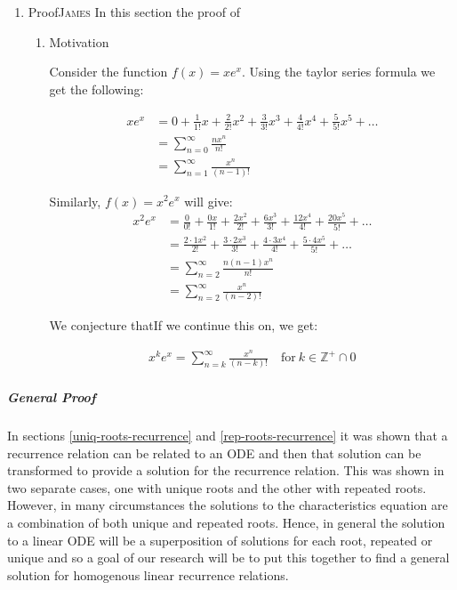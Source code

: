 \documentclass[a4paper,11pt,twoside]{article}
\begin{document}
\begin{enumerate}
\item Proof\hfill{}\textsc{James}
\label{prove-general-exp-identity}
In this section the proof of
\begin{enumerate}
\item Motivation
\label{sec:orgbc00bf8}

Consider the function \(f(x) = xe^x\). Using the taylor series formula we get the following:

\begin{align*}
    xe^x &= 0+\frac{1}{1!}x+\frac{2}{2!}x^2+\frac{3}{3!}x^3+\frac{4}{4!}x^4+\frac{5}{5!}x^5+\dots\\
    &= \sum_{n=0}^\infty \frac{nx^n}{n!}\\
    &= \sum_{n=1}^\infty \frac{x^n}{(n-1)!}
\end{align*}

Similarly, \(f(x) = x^2e^x\) will give:
\begin{align*}
    x^2e^x &= \frac{0}{0!} + \frac{0x}{1!} + \frac{2x^2}{2!} + \frac{6x^3}{3!} + \frac{12x^4}{4!} + \frac{20x^5}{5!} + \dots\\
    &= \frac{2\cdot 1x^2}{2!} + \frac{3\cdot 2 x^3}{3!} + \frac{4\cdot 3x^4}{4!} + \frac{5\cdot 4 x^5}{5!} + \dots\\
    &= \sum_{n=2}^\infty \frac{n(n-1)x^n}{n!}\\
    &= \sum_{n=2}^\infty \frac{x^n}{(n-2)!}
\end{align*}

We conjecture thatIf we continue this on, we get:

\begin{align*}
    x^ke^x = \sum_{n=k}^\infty \frac{x^n}{(n-k)!} \quad \text{for}~k\in \mathbb{Z^{+}}\cap0
\end{align*}
\end{enumerate}
\end{enumerate}

\subparagraph{General Proof}
\label{general-gen-func-proof}
In sections \ref{uniq-roots-recurrence} and \ref{rep-roots-recurrence}
it was shown that a recurrence relation can be related to an ODE and then that
solution can be transformed to provide a solution for the recurrence relation.
This was shown in two separate cases, one with unique roots and the other with
repeated roots. However, in many circumstances the solutions to the characteristics
equation are a combination of both unique and repeated roots. Hence, in general the
solution to a linear ODE will be a superposition of solutions for each root, repeated
or unique and so a goal of our research will be to put this together to find a general
solution for homogenous linear recurrence relations.
\end{document}
